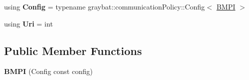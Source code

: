 \begin{DoxyCompactItemize}
\item 
\hypertarget{structgraybat_1_1communicationPolicy_1_1BMPI_a38d4867df284c0642aa17cdefc68c676}{}using {\bfseries Config} = typename graybat\+::communication\+Policy\+::\+Config$<$ \hyperlink{structgraybat_1_1communicationPolicy_1_1BMPI}{B\+M\+P\+I} $>$\label{structgraybat_1_1communicationPolicy_1_1BMPI_a38d4867df284c0642aa17cdefc68c676}

\item 
\hypertarget{structgraybat_1_1communicationPolicy_1_1BMPI_a3dff8c14cca1780c399d51b7eb6df610}{}using {\bfseries Uri} = int\label{structgraybat_1_1communicationPolicy_1_1BMPI_a3dff8c14cca1780c399d51b7eb6df610}

\end{DoxyCompactItemize}
\subsection*{Public Member Functions}
\begin{DoxyCompactItemize}
\item 
\hypertarget{structgraybat_1_1communicationPolicy_1_1BMPI_a7f47c4f3521415aca2f6f6321b8bb87a}{}{\bfseries B\+M\+P\+I} (Config const config)\label{structgraybat_1_1communicationPolicy_1_1BMPI_a7f47c4f3521415aca2f6f6321b8bb87a}

\end{DoxyCompactItemize}
